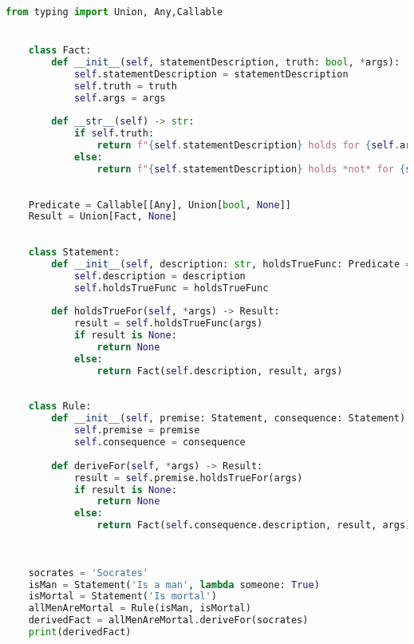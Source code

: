 \begin{lstlisting}[language=python]
	from typing import Union, Any,Callable


	class Fact:
		def __init__(self, statementDescription, truth: bool, *args):
			self.statementDescription = statementDescription
			self.truth = truth
			self.args = args
	
		def __str__(self) -> str:
			if self.truth:
				return f"{self.statementDescription} holds for {self.args}"
			else:
				return f"{self.statementDescription} holds *not* for {self.args}"
	
	
	Predicate = Callable[[Any], Union[bool, None]]
	Result = Union[Fact, None]
	
	
	class Statement:
		def __init__(self, description: str, holdsTrueFunc: Predicate = lambda inpt: None):
			self.description = description
			self.holdsTrueFunc = holdsTrueFunc
	
		def holdsTrueFor(self, *args) -> Result:
			result = self.holdsTrueFunc(args)
			if result is None:
				return None
			else:
				return Fact(self.description, result, args)
			
	
	class Rule:
		def __init__(self, premise: Statement, consequence: Statement):
			self.premise = premise
			self.consequence = consequence
		
		def deriveFor(self, *args) -> Result:
			result = self.premise.holdsTrueFor(args)
			if result is None:
				return None
			else:
				return Fact(self.consequence.description, result, args)
	
	
	
	socrates = 'Socrates'
	isMan = Statement('Is a man', lambda someone: True)
	isMortal = Statement('Is mortal')
	allMenAreMortal = Rule(isMan, isMortal)
	derivedFact = allMenAreMortal.deriveFor(socrates)
	print(derivedFact)
\end{lstlisting}